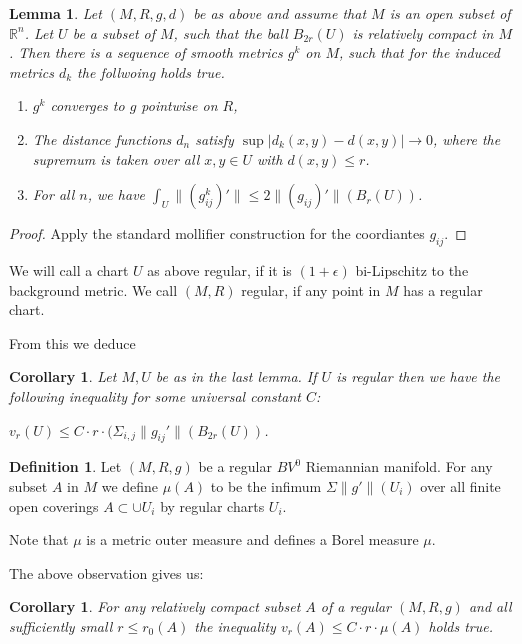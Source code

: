\documentclass[12pt,leqno]{amsart}
\numberwithin{equation}{section}
\newtheorem{lem}[thm]{Lemma}
\newtheorem{cor}[thm]{Corollary}
\theoremstyle{definition}
\newtheorem{defn}[thm]{Definition}%
\theoremstyle{remark}
\newcommand{\R}{\mathbb{R}}
\begin{document}
 \begin{lem}
 Let $(M,R,g,d)$ be as above and assume that $M$ is an open subset of $\R^n$. Let $U$ be a subset
 of $M$, such that the ball $B_{2r} (U)$ is relatively compact in $M$. Then
 there is a sequence of smooth metrics $g^k$ on $M$, such that for the induced metrics $d_k$ the follwoing holds true.

 \begin{enumerate}
 \item $g^k$ converges to $g$ pointwise on $R$,
 \item  The distance functions $d_n$ satisfy $\sup |d_k (x,y)- d(x,y)| \to 0$, where the supremum is taken
 over all $x,y \in U$ with $ d(x,y) \leq r$.
 \item For all $n$, we have $\int _U  \|(g^k_{ij} )'\| \leq 2\|(g _{ij})'\|(  B_r (U))$.
 \end{enumerate}
\end{lem}




\begin{proof}
Apply the standard mollifier construction for the coordiantes $g_{ij}$.
\end{proof}


  We will call a chart $U$ as above regular, if it is $(1+\epsilon)$ bi-Lipschitz to
  the background metric. We call $(M,R)$ regular, if any point in $M$ has a regular
  chart.

 From this we deduce
 \begin{cor}\label{cor-dc-vr}
 Let $M,U$ be  as in the last lemma. If $U$ is regular  then we have the following inequality for some
 universal constant $C$:

 $v_r (U) \leq C \cdot r \cdot (\Sigma _{i,j} \|g_{ij} '\| (B_{2r} (U))$.
\end{cor}


\begin{defn}
Let $(M,R,g)$ be a regular $BV^0$ Riemannian manifold. For any  subset
$A$ in $M$ we define $\mu (A)$ to be the infimum $\Sigma \|g '\| (U_i)$   over all finite open coverings $A\subset  \cup U_i$
by regular charts $U_i$.
\end{defn}

 Note that $\mu$ is a metric outer measure and defines a Borel measure $\mu$.


 The above observation gives us:
 \begin{cor}\label{cor-mu-dc}
 For any relatively compact subset $A$ of a regular $(M,R,g)$ and all sufficiently small $r \leq r_0 (A)$ the
 inequality $v_r (A) \leq C \cdot r \cdot \mu (A)$ holds true.
 \end{cor}
\end{document}
